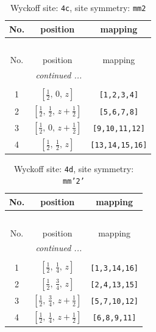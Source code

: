 \documentclass[fleqn,8pt]{jsarticle}
\begin{document}
\renewcommand{\arraystretch}{1.2}
\begin{longtable}{ccc}
\caption{Wyckoff site: {\tt 4c}, site symmetry: {\tt mm2}}
 \\
 \hline \hline
No. & position & mapping \\ \hline \endfirsthead

\multicolumn{2}{l}{\tablename\ \thetable{}} \\
 \hline \hline
No. & position & mapping \\ \hline \endhead

 \hline \hline
\multicolumn{2}{r}{\footnotesize\it continued ...} \\ \endfoot

 \hline \hline
\multicolumn{2}{r}{} \\ \endlastfoot

1 & $\left[ \frac{1}{2},\, 0,\, z \right]$ & {\tt [1,2,3,4]} \\ \hline
2 & $\left[ \frac{1}{2},\, \frac{1}{2},\, z + \frac{1}{2} \right]$ & {\tt [5,6,7,8]} \\ \hline
3 & $\left[ \frac{1}{2},\, 0,\, z + \frac{1}{2} \right]$ & {\tt [9,10,11,12]} \\ \hline
4 & $\left[ \frac{1}{2},\, \frac{1}{2},\, z \right]$ & {\tt [13,14,15,16]} \\
\end{longtable}
\renewcommand{\arraystretch}{1.2}
\begin{longtable}{ccc}
\caption{Wyckoff site: {\tt 4d}, site symmetry: {\tt mm'2'}}
 \\
 \hline \hline
No. & position & mapping \\ \hline \endfirsthead

\multicolumn{2}{l}{\tablename\ \thetable{}} \\
 \hline \hline
No. & position & mapping \\ \hline \endhead

 \hline \hline
\multicolumn{2}{r}{\footnotesize\it continued ...} \\ \endfoot

 \hline \hline
\multicolumn{2}{r}{} \\ \endlastfoot

1 & $\left[ \frac{1}{2},\, \frac{1}{4},\, z \right]$ & {\tt [1,3,14,16]} \\ \hline
2 & $\left[ \frac{1}{2},\, \frac{3}{4},\, z \right]$ & {\tt [2,4,13,15]} \\ \hline
3 & $\left[ \frac{1}{2},\, \frac{3}{4},\, z + \frac{1}{2} \right]$ & {\tt [5,7,10,12]} \\ \hline
4 & $\left[ \frac{1}{2},\, \frac{1}{4},\, z + \frac{1}{2} \right]$ & {\tt [6,8,9,11]} \\
\end{longtable}
\end{document}
